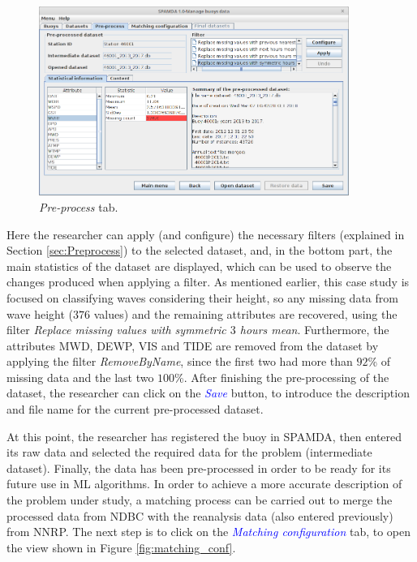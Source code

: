 \documentclass[energies,article,submit,moreauthors,pdftex]{Definitions/mdpi}
\begin{document}
		\begin{figure}[H]
			\centering
			\includegraphics[width=0.90\textwidth]{figures/FigurePreprocess.png}
			\caption{\textit{Pre-process} tab.}\label{fig:preprocess_data}
		\end{figure}
		
		Here the researcher can apply (and configure) the necessary filters (explained in Section \ref{sec:Preprocess}) to the selected dataset, and, in the bottom part, the main statistics of the dataset are displayed, which can be used to observe the changes produced when applying a filter. As mentioned earlier, this case study is focused on classifying waves considering their height, so any missing data from wave height ($376$ values) and the remaining attributes are recovered, using the filter \textit{Replace missing values with symmetric $3$ hours mean}. Furthermore, the attributes MWD, DEWP, VIS and TIDE are removed from the dataset by applying the filter \textit{RemoveByName}, since the first two had more than $92$\% of missing data and the last two $100$\%. After finishing the pre-processing of the dataset, the researcher can click on the \textcolor{blue}{\textit{Save}} button, to introduce the description and file name for the current pre-processed dataset.
		
		At this point, the researcher has registered the buoy in SPAMDA, then entered its raw data and selected the required data for the problem (intermediate dataset). Finally, the data has been pre-processed in order to be ready for its future use in ML algorithms. In order to achieve a more accurate description of the problem under study, a matching process can be carried out to merge the processed data from NDBC with the reanalysis data (also entered previously) from NNRP. The next step is to click on the \textcolor{blue}{\textit{Matching configuration}} tab, to open the view shown in  Figure \ref{fig:matching_conf}. 
		
\end{document}
